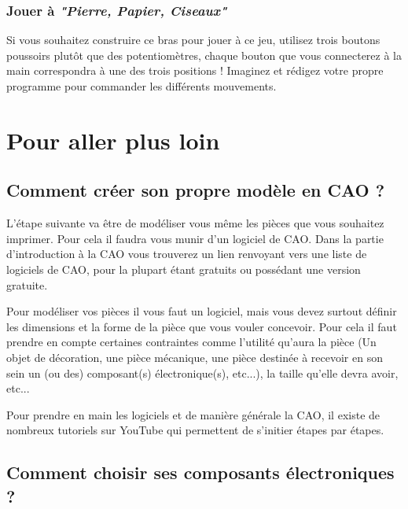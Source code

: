 \begin{flushleft}
\subsubsection{Jouer à \textit{"Pierre, Papier, Ciseaux"}}

Si vous souhaitez construire ce bras pour jouer à ce jeu, utilisez trois boutons poussoirs plutôt que des potentiomètres, chaque bouton que vous connecterez à la main correspondra à une des trois positions ! Imaginez et rédigez votre propre programme pour commander les différents mouvements.

\end{flushleft}

\newpage

\section{Pour aller plus loin}

\subsection{Comment créer son propre modèle en CAO ?}

\begin{flushleft}
    L’étape suivante va être de modéliser vous même les pièces que vous souhaitez imprimer. Pour cela il faudra vous munir d’un logiciel de CAO. Dans la partie d’introduction à la CAO vous trouverez un lien renvoyant vers une liste de logiciels de CAO, pour la plupart étant gratuits ou possédant une version gratuite.
    
    Pour modéliser vos pièces il vous faut un logiciel, mais vous devez surtout définir les dimensions et la forme de la pièce que vous vouler concevoir. Pour cela il faut prendre en compte certaines contraintes comme l’utilité qu’aura la pièce (Un objet de décoration, une pièce mécanique, une pièce destinée à recevoir en son sein un (ou des) composant(s) électronique(s), etc...), la taille qu'elle devra avoir, etc...
    
    Pour prendre en main les logiciels et de manière générale la CAO, il existe de nombreux tutoriels sur YouTube qui permettent de s'initier étapes par étapes.
\end{flushleft}

\subsection{Comment choisir ses composants électroniques ?}

